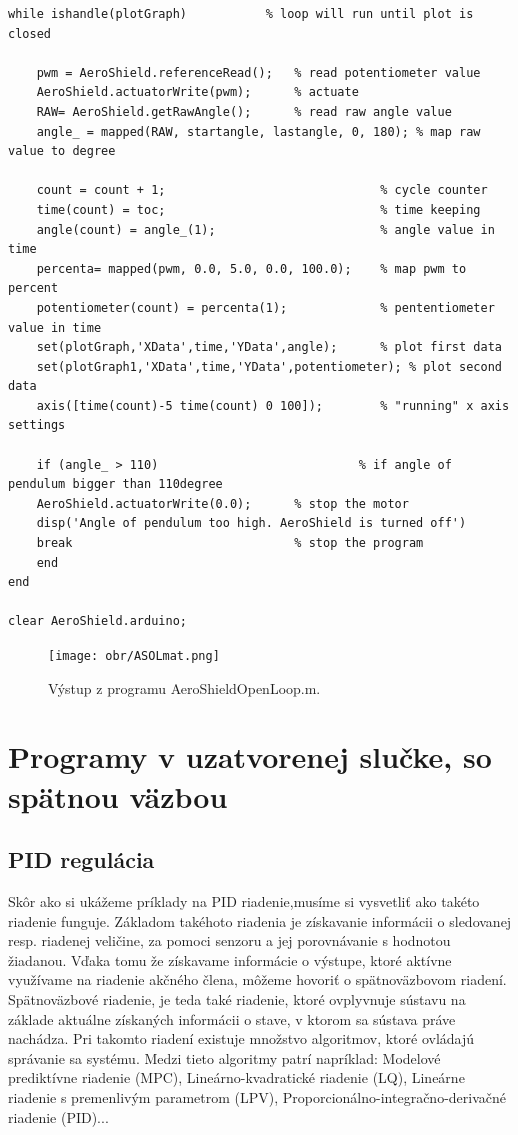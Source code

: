 \begin{lstlisting}[caption={AeroShield open loop, while cyklus.},captionpos=b]
while ishandle(plotGraph)           % loop will run until plot is closed
	
	pwm = AeroShield.referenceRead();   % read potentiometer value
	AeroShield.actuatorWrite(pwm);      % actuate 
	RAW= AeroShield.getRawAngle();      % read raw angle value
	angle_ = mapped(RAW, startangle, lastangle, 0, 180); % map raw value to degree 
	
	count = count + 1;                              % cycle counter
	time(count) = toc;                              % time keeping
	angle(count) = angle_(1);                       % angle value in time
	percenta= mapped(pwm, 0.0, 5.0, 0.0, 100.0);    % map pwm to percent 
	potentiometer(count) = percenta(1);             % pententiometer value in time
	set(plotGraph,'XData',time,'YData',angle);      % plot first data 
	set(plotGraph1,'XData',time,'YData',potentiometer); % plot second data 
	axis([time(count)-5 time(count) 0 100]);        % "running" x axis settings
	
	if (angle_ > 110)                            % if angle of pendulum bigger than 110degree
	AeroShield.actuatorWrite(0.0);      % stop the motor 
	disp('Angle of pendulum too high. AeroShield is turned off')
	break                               % stop the program
	end
end  

clear AeroShield.arduino;           
\end{lstlisting}

\begin{figure}[!tbh]
	\centering
	\texttt{[image: obr/ASOLmat.png]}
	\caption{Výstup z programu AeroShieldOpenLoop.m.}\label{OBRAZOK 3.2}
\end{figure}

\newpage
\section{Programy v uzatvorenej slučke, so spätnou väzbou}
\subsection{PID regulácia}

Skôr ako si ukážeme príklady na PID riadenie,musíme si vysvetliť ako takéto riadenie funguje. Základom takéhoto riadenia je získavanie informácii o sledovanej resp. riadenej veličine, za pomoci senzoru a jej porovnávanie s hodnotou žiadanou. Vďaka tomu že získavame informácie o výstupe, ktoré aktívne využívame na riadenie akčného člena, môžeme hovoriť o spätnoväzbovom riadení. Spätnoväzbové riadenie, je teda také riadenie, ktoré ovplyvnuje sústavu na základe aktuálne získaných informácii o stave, v ktorom sa sústava práve nachádza. Pri takomto riadení existuje množstvo algoritmov, ktoré ovládajú správanie sa systému. Medzi tieto algoritmy patrí napríklad: Modelové prediktívne riadenie (MPC), Lineárno-kvadratické riadenie (LQ), Lineárne riadenie s premenlivým parametrom (LPV), Proporcionálno-integračno-derivačné riadenie (PID)...

